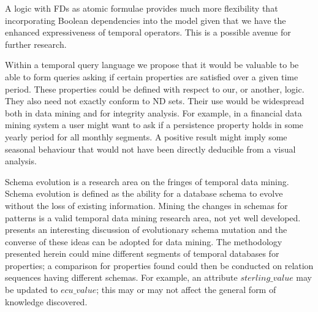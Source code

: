 A logic with FDs as atomic formulae provides much more flexibility
that incorporating Boolean dependencies into the model \cite{drs93}
given that we have the enhanced expressiveness of temporal
operators. This is a possible avenue for further research.
 
\medskip

Within a temporal query language we propose that it would be valuable
to be able to form queries asking if certain properties are satisfied over
a given time period. These properties could be defined with respect to our, or
another, logic. They also need not exactly conform to ND sets. Their
use would be widespread both in data mining and for integrity
analysis. For example, in a financial data mining system a user might
want to ask if a persistence property holds in some yearly period for
all monthly segments.  A positive result might imply some seasonal
behaviour that would not have been directly deducible from a visual
analysis. 


\medskip

Schema evolution \cite{rod94} is a research area on the fringes of
temporal data mining. Schema evolution is defined as the ability for a
database schema to evolve without the loss of existing
information. Mining the changes in schemas for patterns is a valid
temporal data mining research area, not yet well developed.
\cite{van93} presents an interesting discussion of evolutionary schema
mutation and the converse of these ideas can be adopted for data
mining. The methodology presented herein could mine
different segments of temporal databases for properties; a comparison
for properties found could then be conducted on relation sequences
having different schemas. For example, an attribute $sterling\_value$
may be updated to $ecu\_value$; this may or may not affect the general form
of knowledge discovered.  


